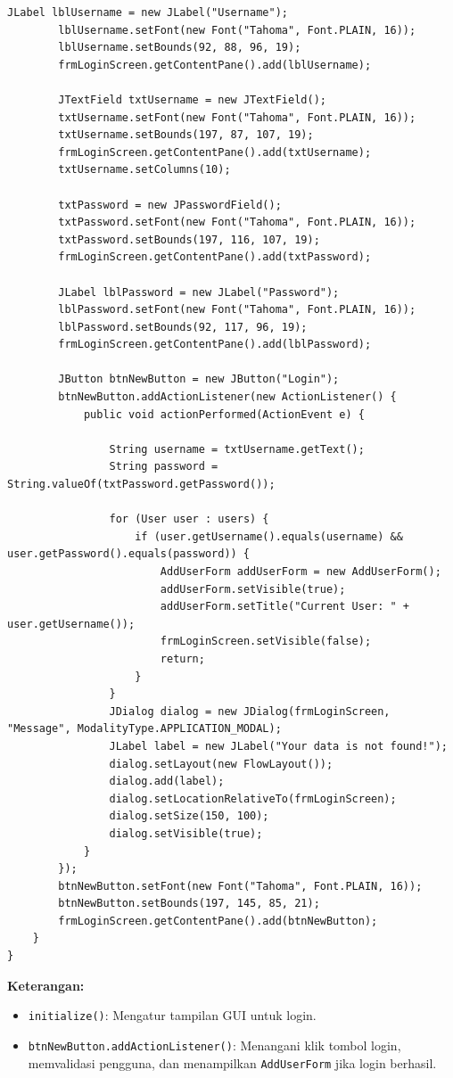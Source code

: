 \begin{lstlisting}[style=JavaStyle]
		JLabel lblUsername = new JLabel("Username");
		lblUsername.setFont(new Font("Tahoma", Font.PLAIN, 16));
		lblUsername.setBounds(92, 88, 96, 19);
		frmLoginScreen.getContentPane().add(lblUsername);
		
		JTextField txtUsername = new JTextField();
		txtUsername.setFont(new Font("Tahoma", Font.PLAIN, 16));
		txtUsername.setBounds(197, 87, 107, 19);
		frmLoginScreen.getContentPane().add(txtUsername);
		txtUsername.setColumns(10);
		
		txtPassword = new JPasswordField();
		txtPassword.setFont(new Font("Tahoma", Font.PLAIN, 16));
		txtPassword.setBounds(197, 116, 107, 19);
		frmLoginScreen.getContentPane().add(txtPassword);
		
		JLabel lblPassword = new JLabel("Password");
		lblPassword.setFont(new Font("Tahoma", Font.PLAIN, 16));
		lblPassword.setBounds(92, 117, 96, 19);
		frmLoginScreen.getContentPane().add(lblPassword);
		
		JButton btnNewButton = new JButton("Login");
		btnNewButton.addActionListener(new ActionListener() {
			public void actionPerformed(ActionEvent e) {
				
				String username = txtUsername.getText();
				String password = String.valueOf(txtPassword.getPassword());
				
				for (User user : users) {
					if (user.getUsername().equals(username) && user.getPassword().equals(password)) {
						AddUserForm addUserForm = new AddUserForm();
						addUserForm.setVisible(true);
						addUserForm.setTitle("Current User: " + user.getUsername());
						frmLoginScreen.setVisible(false);
						return;
					}
				}
				JDialog dialog = new JDialog(frmLoginScreen, "Message", ModalityType.APPLICATION_MODAL);
				JLabel label = new JLabel("Your data is not found!");
				dialog.setLayout(new FlowLayout());
				dialog.add(label);
				dialog.setLocationRelativeTo(frmLoginScreen);
				dialog.setSize(150, 100);
				dialog.setVisible(true);
			}
		});
		btnNewButton.setFont(new Font("Tahoma", Font.PLAIN, 16));
		btnNewButton.setBounds(197, 145, 85, 21);
		frmLoginScreen.getContentPane().add(btnNewButton);
	}
}

\end{lstlisting}

\textbf{Keterangan:} 
\begin{itemize}
\item \texttt{initialize()}: Mengatur tampilan GUI untuk login.
\item \texttt{btnNewButton.addActionListener()}: Menangani klik tombol login, memvalidasi pengguna, dan menampilkan \texttt{AddUserForm} jika login berhasil.
\end{itemize}

